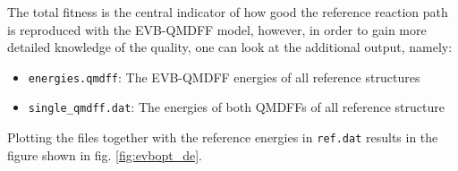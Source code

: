 \documentclass[12pt,a4paper]{scrartcl}
\begin{document}
The total fitness is the central indicator of how good the reference reaction path is 
reproduced with the EVB-QMDFF model, however, in order to gain more detailed knowledge 
of the quality, one can look at the additional output, namely:

\begin{itemize}
 \item \texttt{energies.qmdff}: The EVB-QMDFF energies of all reference structures 
 \item \texttt{single\_qmdff.dat}: The energies of both QMDFFs of all reference structure
\end{itemize}

Plotting the files together with the reference energies in \texttt{ref.dat} results in the 
figure shown in fig. \ref{fig:evbopt_de}.
\end{document}
